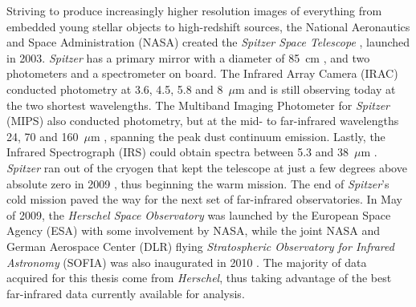 Striving to produce increasingly higher resolution images of everything from embedded young stellar objects to high-redshift sources, the National Aeronautics and Space Administration (NASA) created the \emph{Spitzer Space Telescope} \citep[hereafter \emph{Spitzer}; ][]{2004ApJS..154....1W}, launched in 2003.  \emph{Spitzer} has a primary mirror with a diameter of 85~cm \citep{2004ApJS..154....1W}, and two photometers and a spectrometer on board.  The Infrared Array Camera (IRAC) conducted photometry at 3.6, 4.5, 5.8 and 8~$\mu$m \citep{2004ApJS..154...10F} and is still observing today at the two shortest wavelengths.  The Multiband Imaging Photometer for \emph{Spitzer} (MIPS) also conducted photometry, but at the mid- to far-infrared wavelengths 24, 70 and 160~$\mu$m \citep{2004ApJS..154...25R}, spanning the peak dust continuum emission.  Lastly, the Infrared Spectrograph (IRS) could obtain spectra between 5.3 and 38~$\mu$m \citep{2004ApJS..154...18H}.  \emph{Spitzer} ran out of the cryogen that kept the telescope at just a few degrees above absolute zero in 2009 \citep{2010SPIE.7731E..17C}, thus beginning the warm mission.  The end of \emph{Spitzer}'s cold mission paved the way for the next set of far-infrared observatories. In May of 2009, the \emph{Herschel Space Observatory} \citep[hereafter \emph{Herschel}; ][]{2010A&A...518L...1P} was launched by the European Space Agency (ESA) with some involvement by NASA, while the joint NASA and German Aerospace Center (DLR) flying \emph{Stratospheric Observatory for Infrared Astronomy} (SOFIA) was also inaugurated in 2010 \citep{2012ApJ...749L..17Y}.  The majority of data acquired for this thesis come from \emph{Herschel}, thus taking advantage of the best far-infrared data currently available for analysis.

